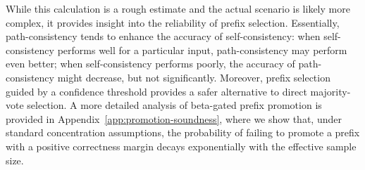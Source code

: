 
While this calculation is a rough estimate and the actual scenario is likely more complex, it provides insight into the reliability of prefix selection. Essentially, path-consistency tends to enhance the accuracy of self-consistency: when self-consistency performs well for a particular input, path-consistency may perform even better; when self-consistency performs poorly, the accuracy of path-consistency might decrease, but not significantly. Moreover, prefix selection guided by a confidence threshold provides a safer alternative to direct majority-vote selection. A more detailed analysis of beta-gated prefix promotion is provided in Appendix~\ref{app:promotion-soundness}, where we show that, under standard concentration assumptions, the probability of failing to promote a prefix with a positive correctness margin decays exponentially with the effective sample size.